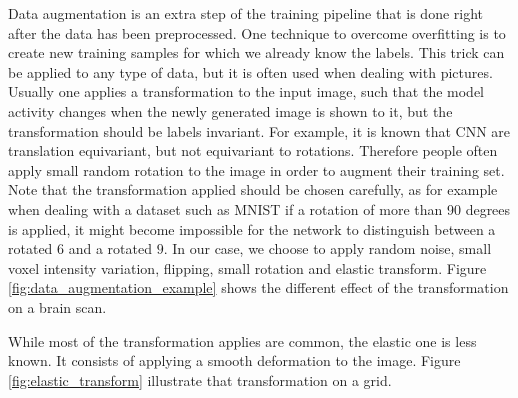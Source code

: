 Data augmentation is an extra step of the training pipeline that is done right after the data has been preprocessed. One technique to overcome overfitting is to create new training samples for which we already know the labels. This trick can be applied to any type of data, but it is often used when dealing with pictures. Usually one applies a transformation to the input image, such that the model activity changes when the newly generated image is shown to it, but the transformation should be labels invariant. 
For example, it is known that CNN are translation equivariant, but not equivariant to rotations. Therefore people often apply small random rotation to the image in order to augment their training set. Note that the transformation applied should be chosen carefully, as for example when dealing with a dataset such as MNIST if a rotation of more than 90 degrees is applied, it might become impossible for the network to distinguish between a rotated $6$ and a rotated $9$. 
In our case, we choose to apply random noise, small voxel intensity variation, flipping, small rotation and elastic transform. Figure \ref{fig:data_augmentation_example} shows the different effect of the transformation on a brain scan.

While most of the transformation applies are common, the elastic one is less known. It consists of applying a smooth deformation to the image. Figure \ref{fig:elastic_transform} illustrate that transformation on a grid.


